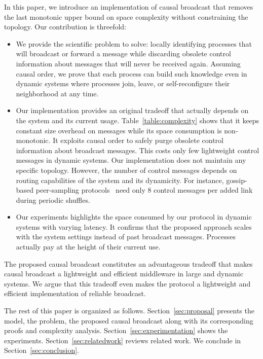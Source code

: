 In this paper, we introduce an implementation of causal broadcast that removes
the last monotonic upper bound on space complexity without constraining the
topology.  Our contribution is threefold:
\begin{itemize}[leftmargin=*]
\item We provide the scientific problem to solve: locally identifying processes
  that will broadcast or forward a message while discarding obsolete control
  information about messages that will never be received again. Assuming causal
  order, we prove that each process can build such knowledge even in dynamic
  systems where processes join, leave, or self-reconfigure their neighborhood at
  any time.
\item Our implementation provides an original tradeoff that actually depends on
  the system and its current usage. Table~\ref{table:complexity} shows that it
  keeps constant size overhead on messages while its space consumption is
  non-monotonic. It exploits causal order to safely purge obsolete control
  information about broadcast messages. This costs only few lightweight control
  messages in dynamic systems.  Our implementation does not maintain any
  specific topology. However, the number of control messages depends on routing
  capabilities of the system and its dynamicity. For instance, gossip-based
  peer-sampling
  protocols~\cite{jelasity2007gossip,jelasity2009tman,nedelec2017adaptive} need
  only 8 control messages per added link during periodic shuffles.
\item Our experiments highlights the space consumed by our protocol in dynamic
  systems with varying latency. It confirms that the proposed approach scales
  with the system settings instead of past broadcast messages. Processes
  actually pay at the height of their current use.
\end{itemize}
The proposed causal broadcast constitutes an advantageous tradeoff that makes
causal broadcast a lightweight and efficient middleware in large and dynamic
systems. We argue that this tradeoff even makes the protocol a lightweight and
efficient implementation of reliable broadcast.

The rest of this paper is organized as follows. 
Section~\ref{sec:proposal} presents the model, the problem, the proposed causal
broadcast along with its corresponding proofs and complexity
analysis. Section~\ref{sec:experimentation} shows the
experiments. Section~\ref{sec:relatedwork} reviews related work. We conclude in
Section~\ref{sec:conclusion}.


